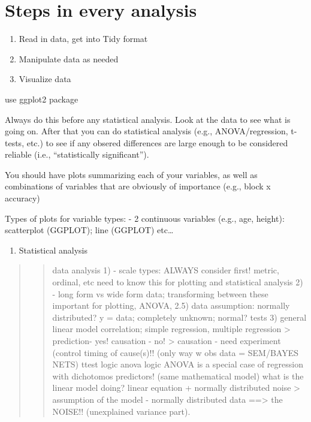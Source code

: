 \documentclass[
]{book}
\providecommand{\tightlist}{%
  \setlength{\itemsep}{0pt}\setlength{\parskip}{0pt}}
\begin{document}
\hypertarget{steps-in-every-analysis}{%
\section{Steps in every analysis}\label{steps-in-every-analysis}}

\begin{enumerate}
\def\labelenumi{\arabic{enumi})}
\item
  Read in data, get into Tidy format
\item
  Manipulate data as needed
\item
  Visualize data
\end{enumerate}

use ggplot2 package

Always do this before any statistical analysis. Look at the data to see what is going on. After that you can do statistical analysis (e.g., ANOVA/regression, t-tests, etc.) to see if any obsered differences are large enough to be considered reliable (i.e., ``statistically significant'').

You should have plots summarizing each of your variables, as well as combinations of variables that are obviously of importance (e.g., block x accuracy)

Types of plots for variable types:
- 2 continuous variables (e.g., age, height): scatterplot (GGPLOT); line (GGPLOT)
etc\ldots{}

\begin{enumerate}
\def\labelenumi{\arabic{enumi})}
\setcounter{enumi}{3}
\tightlist
\item
  Statistical analysis
\end{enumerate}

\begin{quote}
\begin{quote}
data analysis
1) - scale types: ALWAYS consider first!
metric, ordinal, etc
need to know this for plotting and statistical analysis
2) - long form vs wide form data; transforming between these
important for plotting, ANOVA,
2.5) data assumption: normally distributed? y = data; completely unknown; normal? tests
3) general linear model
correlation; simple regression, multiple regression
\textgreater{} prediction- yes! causation - no!
\textgreater{} causation - need experiment (control timing of cause(s)!! (only way w obs data = SEM/BAYES NETS)
ttest logic
anova logic
ANOVA is a special case of regression with dichotomos predictors! (same mathematical model)
what is the linear model doing? linear equation + normally distributed noise
\textgreater{} assumption of the model - normally distributed data ==\textgreater{} the NOISE!! (unexplained variance part).
\end{quote}
\end{quote}
\end{document}
